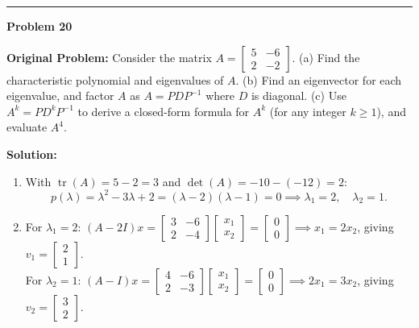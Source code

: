 \documentclass[11pt, letterpaper]{article}
\theoremstyle{definition}
\theoremstyle{remark}
\begin{document}
\noindent\rule{\textwidth}{0.4pt}

\noindent\textbf{Problem 20}

\textbf{Original Problem:} Consider the matrix $A = \begin{bmatrix} 5 & -6 \\ 2 & -2 \end{bmatrix}$. (a) Find the characteristic polynomial and eigenvalues of $A$. (b) Find an eigenvector for each eigenvalue, and factor $A$ as $A = PDP^{-1}$ where $D$ is diagonal. (c) Use $A^k = PD^kP^{-1}$ to derive a closed-form formula for $A^k$ (for any integer $k \ge 1$), and evaluate $A^4$.

\textbf{Solution:}
\begin{enumerate}[label=(\alph*), topsep=3pt, itemsep=4pt]
    \item With $\operatorname{tr}(A) = 5 - 2 = 3$ and $\det(A) = -10 - (-12) = 2$:
    \[
    p(\lambda) = \lambda^2 - 3\lambda + 2 = (\lambda - 2)(\lambda - 1) = 0 \implies \lambda_1 = 2, \quad \lambda_2 = 1.
    \]
    \item For $\lambda_1 = 2$: $(A - 2I)x = \begin{bmatrix} 3 & -6 \\ 2 & -4 \end{bmatrix}\begin{bmatrix} x_1 \\ x_2 \end{bmatrix} = \begin{bmatrix} 0 \\ 0 \end{bmatrix} \implies x_1 = 2x_2$, giving $v_1 = \begin{bmatrix} 2 \\ 1 \end{bmatrix}$. \\
    For $\lambda_2 = 1$: $(A - I)x = \begin{bmatrix} 4 & -6 \\ 2 & -3 \end{bmatrix}\begin{bmatrix} x_1 \\ x_2 \end{bmatrix} = \begin{bmatrix} 0 \\ 0 \end{bmatrix} \implies 2x_1 = 3x_2$, giving $v_2 = \begin{bmatrix} 3 \\ 2 \end{bmatrix}$. \\

\end{enumerate}
\end{document}
